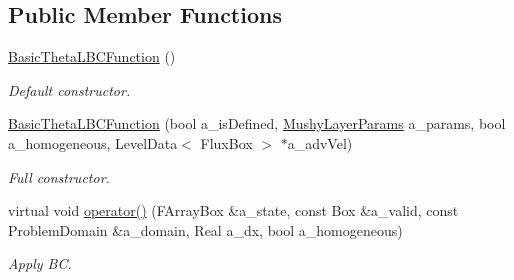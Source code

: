 \subsection*{Public Member Functions}
\begin{DoxyCompactItemize}
\item 
\hypertarget{class_basic_theta_l_b_c_function_ab51bd326ec439a8265f5ab9a1a3230d6}{\hyperlink{class_basic_theta_l_b_c_function_ab51bd326ec439a8265f5ab9a1a3230d6}{Basic\-Theta\-L\-B\-C\-Function} ()}\label{class_basic_theta_l_b_c_function_ab51bd326ec439a8265f5ab9a1a3230d6}

\begin{DoxyCompactList}\small\item\em Default constructor. \end{DoxyCompactList}\item 
\hypertarget{class_basic_theta_l_b_c_function_a951e43666345fef7462f4b44be6c8e20}{\hyperlink{class_basic_theta_l_b_c_function_a951e43666345fef7462f4b44be6c8e20}{Basic\-Theta\-L\-B\-C\-Function} (bool a\-\_\-is\-Defined, \hyperlink{class_mushy_layer_params}{Mushy\-Layer\-Params} a\-\_\-params, bool a\-\_\-homogeneous, Level\-Data$<$ Flux\-Box $>$ $\ast$a\-\_\-adv\-Vel)}\label{class_basic_theta_l_b_c_function_a951e43666345fef7462f4b44be6c8e20}

\begin{DoxyCompactList}\small\item\em Full constructor. \end{DoxyCompactList}\item 
\hypertarget{class_basic_theta_l_b_c_function_a23da1f72bc55f28e3379b656897c452d}{virtual void \hyperlink{class_basic_theta_l_b_c_function_a23da1f72bc55f28e3379b656897c452d}{operator()} (F\-Array\-Box \&a\-\_\-state, const Box \&a\-\_\-valid, const Problem\-Domain \&a\-\_\-domain, Real a\-\_\-dx, bool a\-\_\-homogeneous)}\label{class_basic_theta_l_b_c_function_a23da1f72bc55f28e3379b656897c452d}

\begin{DoxyCompactList}\small\item\em Apply B\-C. \end{DoxyCompactList}\end{DoxyCompactItemize}
